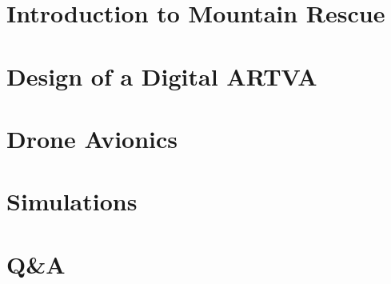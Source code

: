 \documentclass{beamer}
\begin{document}


\section{Introduction to Mountain Rescue}
	
	
	

\section{Design of a Digital ARTVA}
	
	
	
	
	
	

\section{Drone Avionics}
	
	
	
	
	
	
	
	
	
\section{Simulations}
	
	
	
	


\section*{Q\&A}
\end{document}
